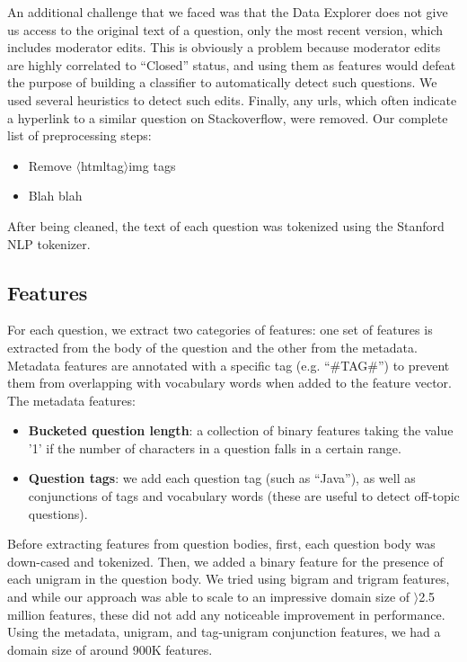 \documentclass[11pt]{article}
\newcommand{\htmltag}{$\langle${htmltag}$\rangle$}
\begin{document}
An additional challenge that we faced was that the Data Explorer does not give us access to the original text of a question, only the most recent version, which includes moderator edits. This is obviously a problem because moderator edits are highly correlated to ``Closed'' status, and using them as features would defeat the purpose of building a classifier to automatically detect such questions. We used several heuristics to detect such edits. Finally, any urls, which often indicate a hyperlink to a similar
question on Stackoverflow, were removed. Our complete list of preprocessing steps:

\begin{itemize}
\item Remove \htmltag{img} tags
\item Blah blah
\end{itemize}

After being cleaned, the text of each question was tokenized using the Stanford NLP tokenizer.

\subsection{Features}

For each question, we extract two categories of features: one set of features is extracted from the body of the question and the other from the metadata. Metadata features are annotated with a specific tag (e.g. ``#TAG#'') to prevent them from overlapping with vocabulary words when added to the feature vector. The metadata features:

\begin{itemize}
  \item \textbf{Bucketed question length}: a collection of binary features
    taking the value '1' if the number of characters in a question falls in a certain range.
  \item \textbf{Question tags}: we add each question tag (such as ``Java''), as well as conjunctions of tags and vocabulary words (these are useful to detect off-topic questions).
\end{itemize}

Before extracting features from question bodies, first, each question
body was down-cased and tokenized. Then, we added a binary feature for the presence of each unigram in the question body. We tried using bigram and trigram features, and while our approach was able to scale to an impressive domain size of $\rangle$2.5 million features, these did not add any noticeable improvement in performance. Using the metadata, unigram, and tag-unigram conjunction features, we had a domain size of around 900K features.
\end{document}
